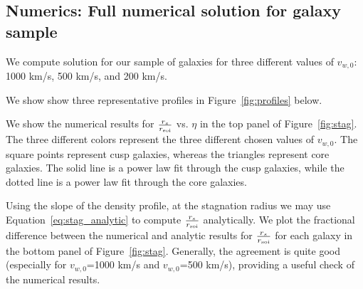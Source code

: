 \documentclass[usenatbib,fleqn]{mn2e}
\newcommand{\soi}{\rm soi}
\newcommand{\rsoi}{r_{\soi}}
\newcommand{\vwO}{v_{w,0}}
\newcommand{\x}{\frac{r_s}{\rsoi}}
\begin{document}
\subsection{Numerics: Full numerical solution for galaxy sample}
We compute solution for our sample of galaxies for three different values of $v_{w,0}$: 1000 km/s, 500 km/s, and 200 km/s. 

We show show three representative profiles in Figure~\ref{fig:profiles} below. 

We show the numerical results for $\x$ vs. $\eta$ in the top panel of
Figure~\ref{fig:stag}.  The three different colors represent the three
different chosen values of $\vwO$. The square points represent cusp
galaxies, whereas the triangles represent core galaxies.  The solid
line is a power law fit through the cusp galaxies, while the dotted
line is a power law fit through the core galaxies.

Using the slope of the density profile, at the stagnation radius we
may use Equation~\ref{eq:stag_analytic} to compute $\x$
analytically. We plot the fractional difference between the numerical
and analytic results for $\x$ for each galaxy in the bottom panel of
Figure~\ref{fig:stag}.  Generally, the agreement is quite good
(especially for $\vwO$=1000 km/s and $\vwO$=500 km/s), providing a
useful check of the numerical results.

\end{document}
